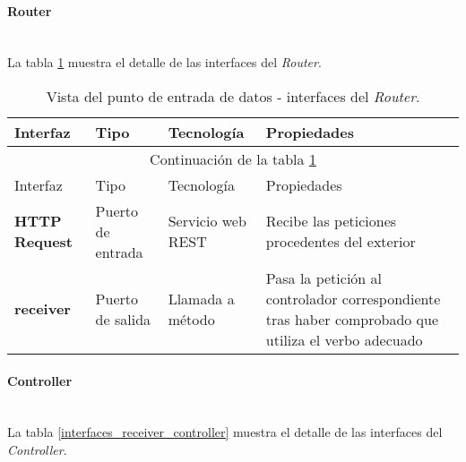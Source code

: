  
 \paragraph{Router} \hfill \\
 La tabla \ref{interfaces_receiver_router} muestra el detalle de las interfaces del \textit{Router}.
 \begin{longtable}[c]{|p{25mm}|p{20mm}|p{30mm}|p{60mm}|}
  \caption{Vista del punto de entrada de datos - interfaces del \textit{Router}.\label{interfaces_receiver_router}}\\
 
  \hline
  	Interfaz & Tipo & Tecnología & Propiedades\\
  \hline
  \hline
  \endfirsthead
  \hline
  \multicolumn{4}{|c|}{Continuación de la tabla \ref{interfaces_receiver_router}}\\
  \hline
  	Interfaz & Tipo & Tecnología & Propiedades\\
  \hline
  \hline
  \endhead
  \hline
  \endfoot
  
 	\textbf{HTTP Request} & Puerto de entrada & Servicio web REST & Recibe las peticiones procedentes del exterior \\
 	\hline
 	
 	\textbf{receiver} & Puerto de salida & Llamada a método & Pasa la petición al controlador correspondiente tras haber comprobado que utiliza el verbo adecuado \\
 \hline
 \hline
 
  \end{longtable}
  
\paragraph{Controller} \hfill \\
La tabla \ref{interfaces_receiver_controller} muestra el detalle de las interfaces del \textit{Controller}.

